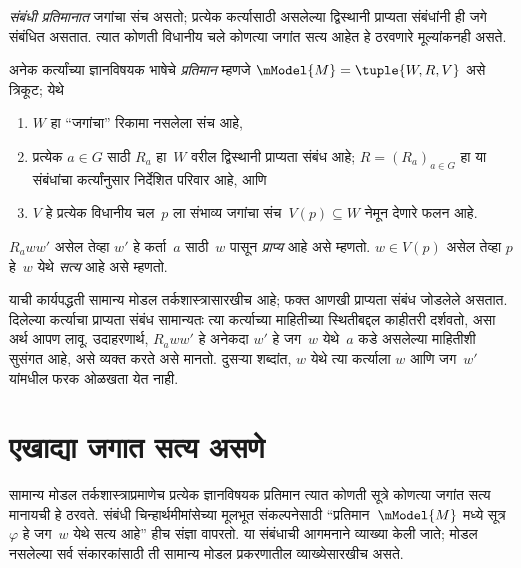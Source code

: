 \emph{संबंधी प्रतिमानात} जगांचा संच असतो; प्रत्येक
कर्त्यासाठी असलेल्या द्विस्थानी प्राप्यता संबंधांनी
ही जगे संबंधित असतात. त्यात कोणती विधानीय चले कोणत्या जगांत सत्य आहेत हे ठरवणारे
मूल्यांकनही असते.

\begin{defn}
  अनेक कर्त्यांच्या ज्ञानविषयक भाषेचे \emph{प्रतिमान}
  म्हणजे $\mModel{M} = \tuple{W, R, V}$ असे त्रिकूट;
  येथे
  \begin{enumerate}
  \item $W$ हा ``जगांचा'' रिकामा नसलेला संच आहे,
  \item प्रत्येक $a \in G$ साठी ${R}_a$ हा~$W$ वरील
  द्विस्थानी प्राप्यता संबंध आहे; $R=(R_a)_{a\in G}$
  हा या संबंधांचा कर्त्यांनुसार निर्देशित परिवार आहे, आणि
  \item $V$ हे प्रत्येक विधानीय चल~$p$ ला संभाव्य जगांचा संच~$V(p)\subseteq W$ नेमून
    देणारे फलन आहे.
  \end{enumerate}
  $R_a ww'$ असेल तेव्हा $w'$ हे कर्ता~$a$ साठी~$w$
  पासून \emph{प्राप्य} आहे असे म्हणतो. $w \in V(p)$
  असेल तेव्हा $p$ हे~$w$ येथे \emph{सत्य} आहे असे म्हणतो.
\end{defn}

याची कार्यपद्धती सामान्य मोडल तर्कशास्त्रासारखीच
आहे; फक्त आणखी प्राप्यता संबंध जोडलेले असतात.
दिलेल्या कर्त्याचा प्राप्यता संबंध सामान्यतः त्या
कर्त्याच्या माहितीच्या स्थितीबद्दल काहीतरी दर्शवतो,
असा अर्थ आपण लावू. उदाहरणार्थ, $R_a ww'$ हे
अनेकदा $w'$ हे जग~$w$ येथे~$a$ कडे असलेल्या
माहितीशी सुसंगत आहे, असे व्यक्त करते असे मानतो.
दुसऱ्या शब्दांत, $w$ येथे त्या कर्त्याला $w$ आणि
जग~$w'$ यांमधील फरक ओळखता येत नाही.













\section{एखाद्या जगात सत्य असणे}\label{aml:el:trw:sec}

सामान्य मोडल तर्कशास्त्राप्रमाणेच प्रत्येक ज्ञानविषयक
प्रतिमान त्यात कोणती सूत्रे कोणत्या जगांत सत्य
मानायची हे ठरवते. संबंधी चिन्हार्थमीमांसेच्या मूलभूत
संकल्पनेसाठी ``प्रतिमान~$\mModel{M}$ मध्ये
सूत्र~$\varphi$ हे जग~$w$ येथे सत्य आहे'' हीच संज्ञा
वापरतो. या संबंधाची आगमनाने व्याख्या केली जाते;
मोडल नसलेल्या सर्व संकारकांसाठी ती सामान्य मोडल
प्रकरणातील व्याख्येसारखीच असते.

